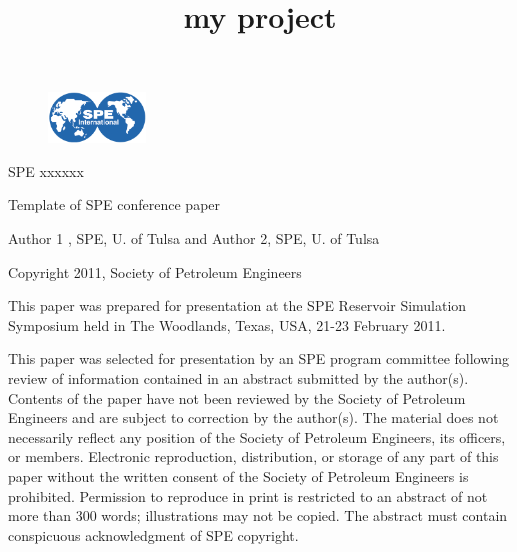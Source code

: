 \documentclass[10pt,twoside]{article}
\begin{document}
\pagestyle{fancy}


\rfoot[]{}
\cfoot[]{}
\lfoot[]{}
%
%
\setlength{\columnseprule}{0pt}

\newcommand{\trp}{^{\scriptsize \text{T}}}
\newcommand{\itp}{^{\scriptsize -\text{T}}}
\newcommand{\sqrtp}{^{\scriptsize \text{T/2}}}
\newcommand{\isqrtp}{^{\scriptsize -\text{T/2}}}
\newcommand{\inv}{^{\scriptsize -1}}
\newcommand{\sqr}{^{\scriptsize \text{1/2}}}
\newcommand{\invsqr}{^{\scriptsize -\text{1/2}}}

\thispagestyle{empty}
\vspace*{-1.0in}
\title{{\noindent \sffamily \Large my project}}

\begin{figure}[!ht]
\flushright
\includegraphics[width=0.23\textwidth]{./SPEInt}
\setlength{\abovecaptionskip}{-10pt}
\end{figure}


{\noindent \sffamily \Large SPE xxxxxx}

\vspace*{32pt}

{\noindent \sffamily \Large {Template of SPE conference paper } }



{\noindent \sffamily Author 1 , SPE, U. of Tulsa and Author 2, SPE, U. of Tulsa}
\bigskip

\noindent \parbox[t]{7.5in}{ \scriptsize \sffamily \noindent
Copyright 2011, Society of Petroleum Engineers

\medskip

\noindent This paper was prepared for presentation at the SPE Reservoir Simulation Symposium held in The Woodlands, Texas, USA, 21-23 February 2011.

\medskip

\noindent This paper was selected for presentation by an SPE program committee following review of information contained in an abstract submitted by the author(s). Contents of the paper have not been reviewed by the Society of Petroleum Engineers and are subject to correction by the author(s). The material does not necessarily reflect any position of the Society of Petroleum Engineers, its officers, or members. Electronic reproduction, distribution, or storage of any part of this paper without the written consent of the Society of Petroleum Engineers is prohibited. Permission to reproduce in print is restricted to an abstract of not more than 300 words; illustrations may not be copied. The abstract must contain conspicuous acknowledgment of SPE copyright.

\noindent \hrulefill}
\end{document}

